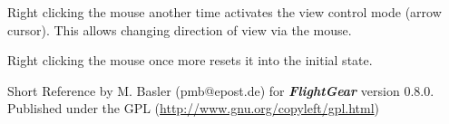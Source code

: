 \documentclass[10pt]{article}
\newcommand{\FlightGear}{{\itshape\bfseries FlightGear}}
\newcommand{\web}[1]{\href{#1}{#1}}
\begin{document}
 \noindent
 Right clicking the mouse another time activates the view control mode (arrow cursor).
 This allows changing direction of view via the mouse.

 \noindent
 Right clicking the mouse once more resets it into the initial state.
 \medskip

 \noindent
 Short Reference by M. Basler (pmb@epost.de) for \FlightGear{} version 0.8.0.\\
 Published under the GPL (\web{http://www.gnu.org/copyleft/gpl.html})
\end{document}
